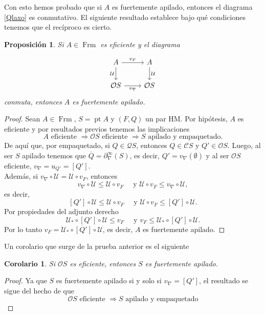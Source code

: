 \documentclass[12pt]{article}
\newtheorem{cor}[thm]{Corolario}
\newtheorem{prop}[thm]{Proposición}
\DeclareMathOperator{\Frm}{Frm}
\DeclareMathOperator{\pt}{pt}
\begin{document}
Con esto hemos probado que si $A$ es fuertemente apilado, entonces el diagrama \eqref{Qlaxo} es conmutativo. El siguiente resultado establece
bajo qué condiciones tenemos que el recíproco es cierto.

\begin{prop}\label{EficienteFapilado}
  Si $A\in \Frm$ es eficiente y el diagrama 

\[\begin{tikzcd}
	A & A \\
	{\mathcal{O}S} & {\mathcal{O}S}
	\arrow["{v_F}", from=1-1, to=1-2]
	\arrow["{\mathcal{U}}"', from=1-1, to=2-1]
	\arrow["{\mathcal{U}}", from=1-2, to=2-2]
	\arrow["{v_\nabla}"', from=2-1, to=2-2]
\end{tikzcd}\]
conmuta, entonces $A$ es fuertemente apilado.
\end{prop}

\begin{proof}
Sean $A\in\Frm$, $S=\pt A$ y $(F, Q)$ un par HM. Por hipótesis, $A$ es eficiente y por resultados previos tenemos las implicaciones
\[
A\text{ eficiente }\Rightarrow \mathcal{O}S\text{ eficiente }\Rightarrow S \text{ apilado y empaquetado.}
\]
De aquí que, por empaquetado, si $Q\in \mathcal{Q}S$, entonces $Q\in \mathcal{C}S$ y $Q'\in \mathcal{O}S$. Luego, al ser $S$ apilado tenemos que
$\overline{Q}=\partial_\nabla^\infty(S)$, es decir, $Q'=v_\nabla(\emptyset)$ y al ser $\mathcal{O}S$ eficiente, $v_\nabla=u_{Q'}=[Q']$.\\
  
Además, si $v_\nabla\circ \mathcal{U}=\mathcal{U}\circ v_F$, entonces
\[
v_\nabla\circ \mathcal{U}\leq \mathcal{U}\circ v_F\quad \text{ y } \mathcal{U}\circ v_F\leq v_\nabla\circ \mathcal{U},
\]
es decir,
\[
[Q']\circ \mathcal{U}\leq \mathcal{U}\circ v_F\quad \text{ y } \mathcal{U}\circ v_F\leq [Q']\circ \mathcal{U}.
\]
Por propiedades del adjunto derecho 
\[
\mathcal{U}_*\circ [Q']\circ \mathcal{U}\leq v_F\quad \text{ y } v_F\leq\mathcal{U}_*\circ [Q']\circ \mathcal{U}.
\]
Por lo tanto $v_F=\mathcal{U}_*\circ [Q']\circ \mathcal{U}$, es decir, $A$ es fuertemente apilado.
\end{proof}

Un corolario que surge de la prueba anterior es el siguiente

\begin{cor}
Si $\mathcal{O}S$ es eficiente, entonces $S$ es fuertemente apilado.
\end{cor}

\begin{proof}
Ya que $S$ es fuertemente apilado si y solo si $v_\nabla=[Q']$, el resultado se sigue del hecho de que 
\[
\mathcal{O}S \text{ eficiente } \Rightarrow S \text{ apilado y empaquetado}
\] 
\end{proof}
\end{document}
